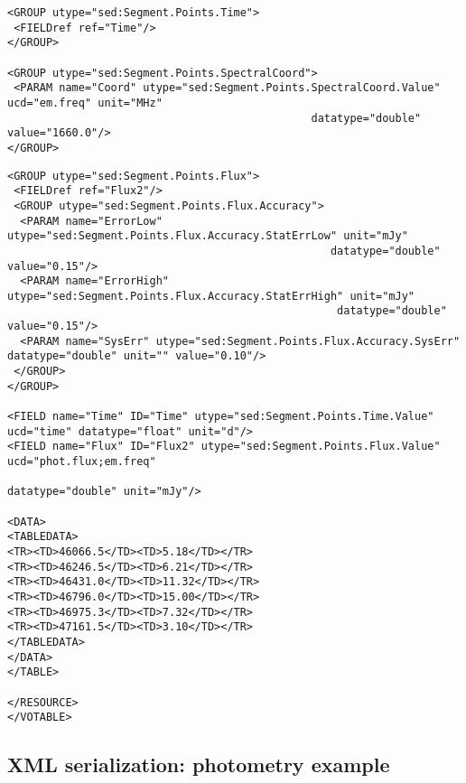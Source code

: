 \documentclass[11pt]{article}
\newenvironment{fmpage}
     {\begin{lrbox}{\fmbox}\begin{minipage}{6.5in}}
     {\end{minipage}\end{lrbox}\colorbox{iblue}{\fbox{\usebox{\fmbox}}}}
\begin{document}
{\begin{flushleft}
\begin{fmpage}
\begin{verbatim}
<GROUP utype="sed:Segment.Points.Time">
 <FIELDref ref="Time"/>
</GROUP>

<GROUP utype="sed:Segment.Points.SpectralCoord">
 <PARAM name="Coord" utype="sed:Segment.Points.SpectralCoord.Value" ucd="em.freq" unit="MHz" 
                                               datatype="double" value="1660.0"/>
</GROUP>

\end{verbatim}
\end{fmpage}

\begin{fmpage}
\begin{verbatim}
<GROUP utype="sed:Segment.Points.Flux">
 <FIELDref ref="Flux2"/>
 <GROUP utype="sed:Segment.Points.Flux.Accuracy">
  <PARAM name="ErrorLow" utype="sed:Segment.Points.Flux.Accuracy.StatErrLow" unit="mJy" 
                                                  datatype="double" value="0.15"/>
  <PARAM name="ErrorHigh" utype="sed:Segment.Points.Flux.Accuracy.StatErrHigh" unit="mJy" 
                                                   datatype="double" value="0.15"/>
  <PARAM name="SysErr" utype="sed:Segment.Points.Flux.Accuracy.SysErr" datatype="double" unit="" value="0.10"/>
 </GROUP>
</GROUP>

<FIELD name="Time" ID="Time" utype="sed:Segment.Points.Time.Value" ucd="time" datatype="float" unit="d"/>
<FIELD name="Flux" ID="Flux2" utype="sed:Segment.Points.Flux.Value" ucd="phot.flux;em.freq" 
                                                         datatype="double" unit="mJy"/>

<DATA>
<TABLEDATA>
<TR><TD>46066.5</TD><TD>5.18</TD></TR>
<TR><TD>46246.5</TD><TD>6.21</TD></TR>
<TR><TD>46431.0</TD><TD>11.32</TD></TR>
<TR><TD>46796.0</TD><TD>15.00</TD></TR>
<TR><TD>46975.3</TD><TD>7.32</TD></TR>
<TR><TD>47161.5</TD><TD>3.10</TD></TR>
</TABLEDATA>
</DATA>
</TABLE>

</RESOURCE>
</VOTABLE>
\end{verbatim}
\end{fmpage}

\end{flushleft}
}

\clearpage
\subsection{XML serialization: photometry example}
\end{document}
